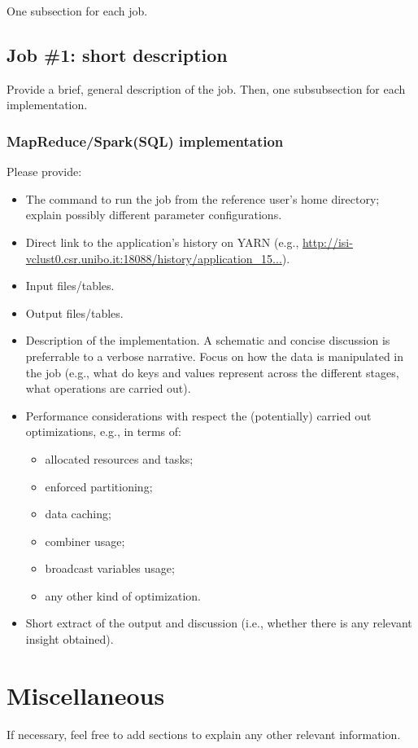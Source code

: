 \documentclass[10pt]{article}
\begin{document}
One subsection for each job.

\subsection{Job \#1: short description}

Provide a brief, general description of the job. Then, one subsubsection for each implementation.

\subsubsection{MapReduce/Spark(SQL) implementation}

Please provide:
\begin{itemize}
\item The command to run the job from the reference user's home directory; explain possibly different parameter configurations.
\item Direct link to the application's history on YARN (e.g., \url{http://isi-vclust0.csr.unibo.it:18088/history/application_15...}).
\item Input files/tables.
\item Output files/tables.
\item Description of the implementation. A schematic and concise discussion is preferrable to a verbose narrative. Focus on how the data is manipulated in the job (e.g., what do keys and values represent across the different stages, what operations are carried out). 
\item Performance considerations with respect the (potentially) carried out optimizations, e.g., in terms of:
\begin{itemize}
\item allocated resources and tasks;
\item enforced partitioning;
\item data caching;
\item combiner usage;
\item broadcast variables usage;
\item any other kind of optimization.
\end{itemize}
\item Short extract of the output and discussion (i.e., whether there is any relevant insight obtained).
\end{itemize}

\section{Miscellaneous}

If necessary, feel free to add sections to explain any other relevant information.
\end{document}
